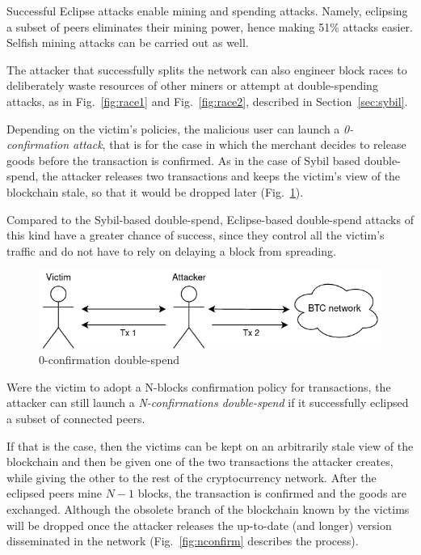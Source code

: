 \documentclass[12pt, letterpaper, twoside]{article}
\begin{document}
Successful Eclipse attacks enable mining and spending attacks. Namely, eclipsing a subset of peers eliminates their mining power, hence making 51\% attacks easier. Selfish mining attacks can be carried out as well.

The attacker that successfully splits the network can also engineer block races to deliberately waste resources of other miners or attempt at double-spending attacks, as in Fig.~\ref{fig:race1} and Fig.~\ref{fig:race2}, described in Section~\ref{sec:sybil}.

Depending on the victim's policies, the malicious user can launch a \textit{0-confirmation attack}, that is for the case in which the merchant decides to release goods before the transaction is confirmed. As in the case of Sybil based double-spend, the attacker releases two transactions and keeps the victim's view of the blockchain stale, so that it would be dropped later (Fig.~\ref{fig:0confirm}).

Compared to the Sybil-based double-spend, Eclipse-based double-spend attacks of this kind have a greater chance of success, since they control all the victim's traffic and do not have to rely on delaying a block from spreading.

\begin{figure}[h!]
	\includegraphics[width=.7\textwidth]{pict/0confirm-doublespend.png}
	\centering
	\caption{0-confirmation double-spend}
	\label{fig:0confirm}
\end{figure}

Were the victim to adopt a N-blocks confirmation policy for transactions, the attacker can still launch a \textit{N-confirmations double-spend} if it successfully eclipsed a subset of connected peers.

If that is the case, then the victims can be kept on an arbitrarily stale view of the blockchain and then be given one of the two transactions the attacker creates, while giving the other to the rest of the cryptocurrency network. After the eclipsed peers mine $N - 1$ blocks, the transaction is confirmed and the goods are exchanged. Although the obsolete branch of the blockchain known by the victims will be dropped once the attacker releases the up-to-date (and longer) version disseminated in the network (Fig.~\ref{fig:nconfirm} describes the process).  
\end{document}
